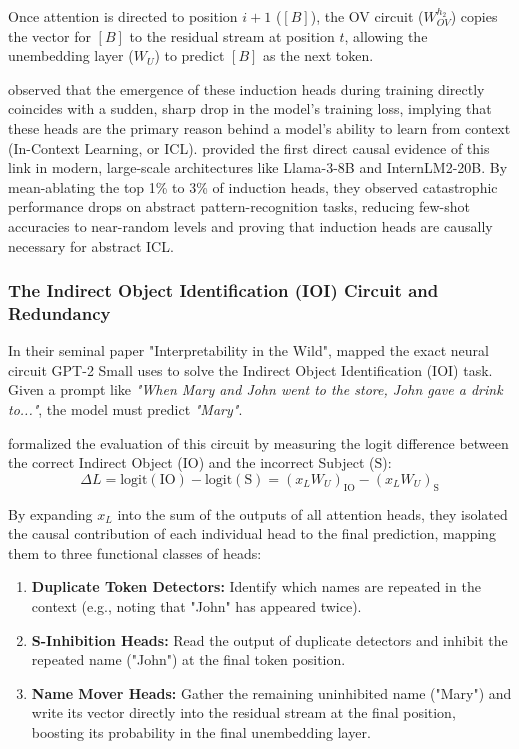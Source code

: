 \documentclass[11pt]{article}
\begin{document}
Once attention is directed to position $i+1$ ($[B]$), the OV circuit ($W_{OV}^{h_2}$) copies the vector for $[B]$ to the residual stream at position $t$, allowing the unembedding layer ($W_U$) to predict $[B]$ as the next token.

\citet{Olsson2022} observed that the emergence of these induction heads during training directly coincides with a sudden, sharp drop in the model's training loss, implying that these heads are the primary reason behind a model's ability to learn from context (In-Context Learning, or ICL). \citet{crosbie2024} provided the first direct causal evidence of this link in modern, large-scale architectures like Llama-3-8B and InternLM2-20B. By mean-ablating the top 1\% to 3\% of induction heads, they observed catastrophic performance drops on abstract pattern-recognition tasks, reducing few-shot accuracies to near-random levels and proving that induction heads are causally necessary for abstract ICL.

\subsubsection{The Indirect Object Identification (IOI) Circuit and Redundancy}

In their seminal paper "Interpretability in the Wild", \citet{wang2022} mapped the exact neural circuit GPT-2 Small uses to solve the Indirect Object Identification (IOI) task. Given a prompt like \textit{"When Mary and John went to the store, John gave a drink to..."}, the model must predict \textit{"Mary"}.

\citet{wang2022} formalized the evaluation of this circuit by measuring the logit difference between the correct Indirect Object ($\text{IO}$) and the incorrect Subject ($\text{S}$):
\begin{equation}
    \Delta L = \text{logit}(\text{IO}) - \text{logit}(\text{S}) = (x_L W_U)_{\text{IO}} - (x_L W_U)_{\text{S}}
\end{equation}

By expanding $x_L$ into the sum of the outputs of all attention heads, they isolated the causal contribution of each individual head to the final prediction, mapping them to three functional classes of heads:
\begin{enumerate}
    \item \textbf{Duplicate Token Detectors:} Identify which names are repeated in the context (e.g., noting that "John" has appeared twice).
    \item \textbf{S-Inhibition Heads:} Read the output of duplicate detectors and inhibit the repeated name ("John") at the final token position.
    \item \textbf{Name Mover Heads:} Gather the remaining uninhibited name ("Mary") and write its vector directly into the residual stream at the final position, boosting its probability in the final unembedding layer.
\end{enumerate}
\end{document}
